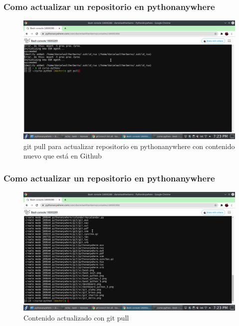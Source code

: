\documentclass[11pt]{beamer}
\begin{document}
\begin{frame}
	\frametitle{Como actualizar un repositorio en pythonanywhere}
\begin{figure}
	\centering
	\includegraphics[width=0.7\linewidth]{sc/git_pull_alpha}
	\caption{git pull para actualizar repositorio en pythonanywhere con contenido nuevo que está en Github}
	\label{fig:gitpullalpha}
\end{figure}

	
\end{frame}

\begin{frame}
	\frametitle{Como actualizar un repositorio en pythonanywhere}
\begin{figure}
	\centering
	\includegraphics[width=0.7\linewidth]{sc/git_pull_bravo}
	\caption{Contenido actualizado con git pull}
	\label{fig:gitpullbravo}
\end{figure}
	
	
\end{frame}
\end{document}
